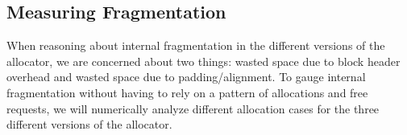 

%



\newpage
\subsection{Measuring Fragmentation}

When reasoning about internal fragmentation in the different versions of the allocator, we are concerned about two things: wasted space due to block header overhead and wasted space due to padding/alignment. To gauge internal fragmentation without having to rely on a pattern of allocations and free requests, we will numerically analyze different allocation cases for the three different versions of the allocator.

